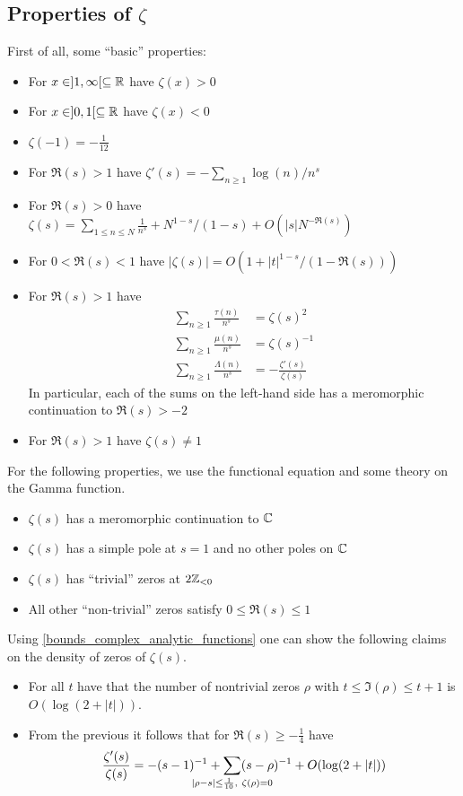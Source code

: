 \subsection{Properties of $\zeta$}
First of all, some ``basic'' properties:
\begin{itemize}
    \item For $x \in ]1, \infty[ \subseteq \mathbb{R}$ have $\zeta(x) > 0$
    \item For $x \in ]0, 1[ \subseteq \mathbb{R}$ have $\zeta(x) < 0$
    \item $\zeta(-1) = -\frac 1 {12}$
    \item For $\Re(s) > 1$ have $\zeta'(s) = -\sum_{n \geq 1} \log(n)/n^s$
    \item For $\Re(s) > 0$ have $\zeta(s) = \sum_{1 \leq n \leq N} \frac 1 {n^s} + N^{1 - s}/(1 - s) + O(|s| N^{-\Re(s)})$
    \item For $0 < \Re(s) < 1$ have $|\zeta(s)| = O(1 + |t|^{1 - s}/(1 - \Re(s)))$
    \item For $\Re(s) > 1$ have
    \begin{align*}
        \sum_{n \geq 1} \frac {\tau(n)} {n^s} &= \zeta(s)^2 \\
        \sum_{n \geq 1} \frac {\mu(n)} {n^s} &= \zeta(s)^{-1} \\
        \sum_{n \geq 1} \frac {\Lambda(n)} {n^s} &= -\frac {\zeta'(s)} {\zeta(s)}
    \end{align*}
    In particular, each of the sums on the left-hand side has a meromorphic continuation to $\Re(s) > -2$
    \item For $\Re(s) > 1$ have $\zeta(s) \neq 1$
\end{itemize}
For the following properties, we use the functional equation and some theory on the Gamma function.
\begin{itemize}
    \item $\zeta(s)$ has a meromorphic continuation to $\mathbb{C}$
    \item $\zeta(s)$ has a simple pole at $s = 1$ and no other poles on $\mathbb{C}$
    \item $\zeta(s)$ has ``trivial'' zeros at $2\mathbb{Z}_{< 0}$
    \item All other ``non-trivial'' zeros satisfy $0 \leq \Re(s) \leq 1$
\end{itemize}
Using \ref{bounds_complex_analytic_functions} one can show the following claims on the density of zeros of $\zeta(s)$.
\begin{itemize}
    \item For all $t$ have that the number of nontrivial zeros $\rho$ with $t \leq \Im(\rho) \leq t + 1$ is $O(\log(2 + |t|))$.
    \item From the previous it follows that for $\Re(s) \geq -\frac 1 4$ have
    \begin{equation*}
        \frac {\zeta'(s)} {\zeta(s)} = -(s - 1)^{-1} + \sum_{\mathclap{|\rho - s| \leq \frac 1 {10}, \ \zeta(\rho) = 0}} (s - \rho)^{-1} + O(\log(2 + |t|))
    \end{equation*}
\end{itemize}

